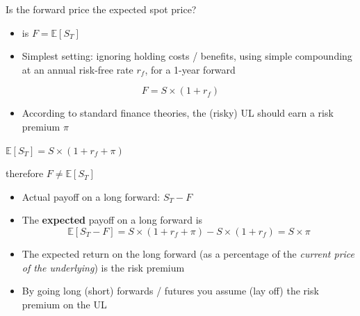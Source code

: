 \documentclass[
  ignorenonframetext,
  aspectratio=169]{beamer}
\providecommand{\tightlist}{%
  \setlength{\itemsep}{0pt}\setlength{\parskip}{0pt}}
\begin{document}
\begin{frame}{Is the forward price the expected spot price?}
\protect\hypertarget{is-the-forward-price-the-expected-spot-price}{}
\begin{itemize}
\tightlist
\item
  is \(F=\mathbb{E}[S_T]\)
\item
  Simplest setting: ignoring holding costs / benefits, using simple
  compounding at an annual risk-free rate \(r_f\), for a 1-year forward
\end{itemize}

\[F = S \times (1+r_f)\]

\begin{itemize}
\tightlist
\item
  According to standard finance theories, the (risky) UL should earn a
  risk premium \(\pi\)
\end{itemize}

\(\mathbb{E}[S_T] = S \times (1+r_f+\pi)\)

therefore \(F \neq \mathbb{E}[S_T]\)
\end{frame}

\begin{frame}
\begin{itemize}
\item
  Actual payoff on a long forward: \(S_T - F\)
\item
  The \textbf{expected} payoff on a long forward is \[
  \mathbb{E}[S_T-F] = S \times (1 + r_f + \pi) - S \times (1 + r_f) = S \times \pi
  \]
\item
  The expected return on the long forward (as a percentage of the
  \emph{current price of the underlying}) is the risk premium
\item
  By going long (short) forwards / futures you assume (lay off) the risk
  premium on the UL
\end{itemize}
\end{frame}
\end{document}
